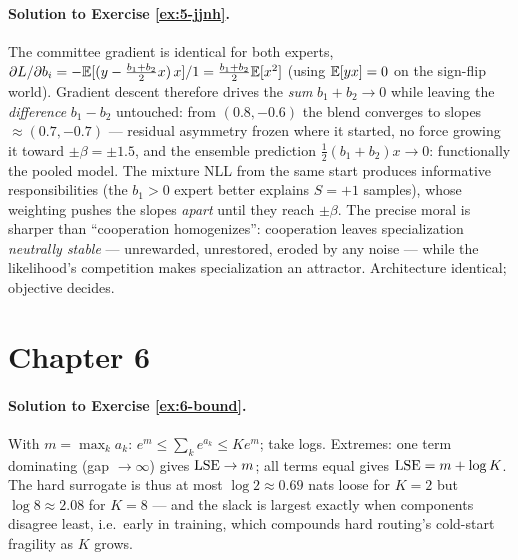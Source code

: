 \paragraph{Solution to Exercise \ref{ex:5-jjnh}.}
The committee gradient is identical for both experts,
$\partial L/\partial b_i = -\mathbb{E}[(y - \tfrac{b_1 + b_2}{2}x)\,x]/1 =
\tfrac{b_1 + b_2}{2}\mathbb{E}[x^2]$ (using $\mathbb{E}[yx] = 0$ on the sign-flip
world). Gradient descent therefore drives the \emph{sum} $b_1 + b_2 \to
0$ while leaving the \emph{difference} $b_1 - b_2$ untouched: from
$(0.8, -0.6)$ the blend converges to slopes $\approx (0.7, -0.7)$ ---
residual asymmetry frozen where it started, no force growing it toward
$\pm\beta = \pm 1.5$, and the ensemble prediction $\tfrac12(b_1 +
b_2)x \to 0$: functionally the pooled model. The mixture NLL from the
same start produces informative responsibilities (the $b_1 > 0$ expert
better explains $S = +1$ samples), whose weighting pushes the slopes
\emph{apart} until they reach $\pm\beta$. The precise moral is sharper
than ``cooperation homogenizes'': cooperation leaves specialization
\emph{neutrally stable} --- unrewarded, unrestored, eroded by any noise
--- while the likelihood's competition makes specialization an
attractor. Architecture identical; objective decides.

\section*{Chapter 6}

\paragraph{Solution to Exercise \ref{ex:6-bound}.}
With $m = \max_k a_k$: $e^m \le \sum_k e^{a_k} \le K e^m$; take logs.
Extremes: one term dominating (gap $\to \infty$) gives $\operatorname{LSE} \to m$;
all terms equal gives $\operatorname{LSE} = m + \log K$. The hard surrogate is thus
at most $\log 2 \approx 0.69$ nats loose for $K = 2$ but $\log 8
\approx 2.08$ for $K = 8$ --- and the slack is largest exactly when
components disagree least, i.e.\ early in training, which compounds
hard routing's cold-start fragility as $K$ grows.

